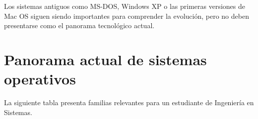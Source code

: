 \documentclass[
  spanish,
  letterpaper,
]{scrbook}
\begin{document}
\begin{tcolorbox}[enhanced jigsaw, arc=.35mm, bottomrule=.15mm, bottomtitle=1mm, breakable, colback=white, colbacktitle=quarto-callout-note-color!10!white, colframe=quarto-callout-note-color-frame, coltitle=black, left=2mm, leftrule=.75mm, opacityback=0, opacitybacktitle=0.6, rightrule=.15mm, title=\textcolor{quarto-callout-note-color}{\faInfo}\hspace{0.5em}{Perspectiva histórica}, titlerule=0mm, toprule=.15mm, toptitle=1mm]

Los sistemas antiguos como MS-DOS, Windows XP o las primeras versiones
de Mac OS siguen siendo importantes para comprender la evolución, pero
no deben presentarse como el panorama tecnológico actual.

\end{tcolorbox}


\chapter{Panorama actual de sistemas
operativos}\label{panorama-actual-de-sistemas-operativos}

La siguiente tabla presenta familias relevantes para un estudiante de
Ingeniería en Sistemas.
\end{document}
